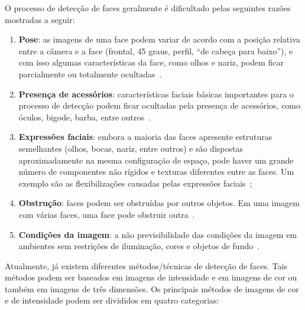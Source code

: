 	O processo de detecção de faces geralmente é dificultado pelas seguintes razões
	mostradas a seguir:

	\begin{enumerate}
		\item \textbf{Pose}: as imagens de uma face podem variar de acordo com a posição
		relativa entre a câmera e a face (frontal, 45 graus, perfil, ``de cabeça para
		baixo''), e com isso algumas características da face, como olhos e nariz, podem
		ficar parcialmente ou totalmente ocultadas~\cite{yang}.
				 
		\item \textbf{Presença de acessórios}: características faciais básicas
		importantes para o processo de detecção podem ficar ocultadas pela presença de
		acessórios, como óculos, bigode, barba, entre outros~\cite{oliveira, yang}.
		 
		\item \textbf{Expressões faciais}: embora a maioria das faces apresente
		estruturas semelhantes (olhos, bocas, nariz, entre outros) e são dispostas
		aproximadamente na mesma configuração de espaço, pode haver um grande número de
		componentes não rígidos e texturas diferentes entre as faces. Um exemplo são as
		flexibilizações causadas pelas expressões faciais~\cite{oliveira, yang};
				 
		\item \textbf{Obstrução}: faces podem ser obstruídas por outros objetos. Em uma
		imagem com várias faces, uma face pode obstruir outra~\cite{yang}.
		
		\item \textbf{Condições da imagem}: a não previsibilidade das condições da
		imagem em ambientes sem restrições de iluminação, cores e objetos de
		fundo~\cite{oliveira, yang}.
	\end{enumerate}

	Atualmente, já existem diferentes métodos/técnicas de detecção de faces. Tais
	métodos podem ser baseados em imagens de intensidade e em imagens de cor ou
	também em imagens de três dimensões. Os principais métodos de imagens de cor e
	de intensidade podem ser divididos em quatro categorias:

